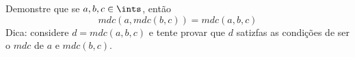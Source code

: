 \begin{exercise}
	Demonstre que se $a,b,c \in \ints$, então
	$$
		mdc(a,mdc(b,c)) = mdc(a,b,c)
	$$
	Dica: considere $d = mdc(a, b, c)$ e tente provar que $d$ satizfas as condições de ser o $mdc$ de $a$ e $mdc(b,c)$.
\end{exercise}
